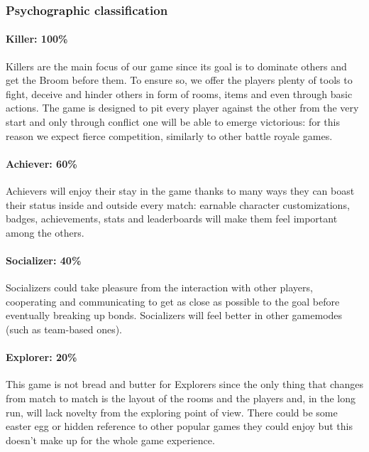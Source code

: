 \subsubsection{Psychographic classification}


\paragraph{Killer: 100\%}
Killers are the main focus of our game since its goal is to dominate others and get the Broom before them. To ensure so, we offer the players plenty of tools to fight, deceive and hinder others in form of rooms, items and even through basic actions. The game is designed to pit every player against the other from the very start and only through conflict one will be able to emerge victorious: for this reason we expect fierce competition, similarly to other battle royale games.

\paragraph{Achiever: 60\%}
Achievers will enjoy their stay in the game thanks to many ways they can boast their status inside and outside every match: earnable character customizations, badges, achievements, stats and leaderboards will make them feel important among the others.

\paragraph{Socializer: 40\%}
Socializers could take pleasure from the interaction with other players, cooperating and communicating to get as close as possible to the goal before eventually breaking up bonds. Socializers will feel better in other gamemodes (such as team-based ones).

\paragraph{Explorer: 20\%}
This game is not bread and butter for Explorers since the only thing that changes from match to match is the layout of the rooms and the players and, in the long run, will lack novelty from the exploring point of view. There could be some easter egg or hidden reference to other popular games they could enjoy but this doesn't make up for the whole game experience.



\pagebreak